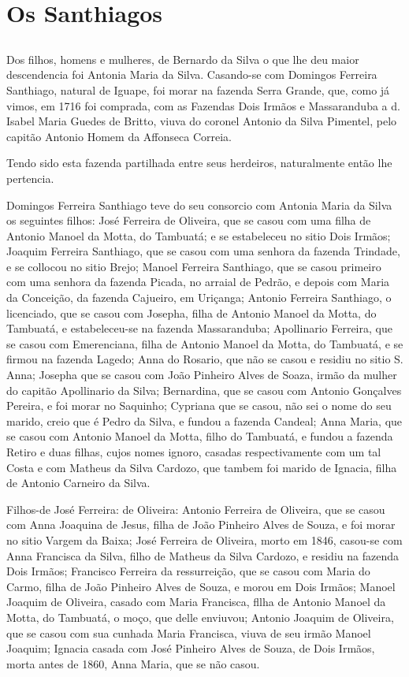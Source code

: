 \chapter{Os Santhiagos}
\section*{}
Dos filhos, homens e mulheres, de Bernardo da Silva o que lhe deu maior descendencia foi Antonia Maria da Silva. Casando-se com
Domingos Ferreira Santhiago, natural de Iguape, foi morar na fazenda Serra Grande, que, como já vimos, em 1716 foi comprada, com as Fazendas Dois Irmãos e Massaranduba a d. Isabel Maria Guedes de Britto, viuva do coronel Antonio da Silva Pimentel, pelo capitão Antonio Homem da Affonseca Correia.

Tendo sido esta fazenda partilhada entre seus herdeiros, naturalmente então lhe pertencia.

Domingos Ferreira Santhiago teve do seu consorcio com Antonia Maria da Silva os seguintes filhos: José Ferreira de Oliveira, que se casou com uma filha de Antonio Manoel da Motta, do Tambuatá; e se estabeleceu no sitio Dois Irmãos; Joaquim Ferreira Santhiago, que se casou com uma senhora da fazenda Trindade, e se collocou no sitio Brejo; Manoel Ferreira Santhiago, que se casou primeiro com uma senhora da fazenda Picada, no arraial de Pedrão, e depois com Maria da Conceição, da fazenda Cajueiro, em Uriçanga; Antonio Ferreira Santhiago, o licenciado, que se casou com Josepha, filha de Antonio Manoel da Motta, do Tambuatá, e estabeleceu-se na fazenda Massaranduba; Apollinario Ferreira, que se casou com Emerenciana, filha de Antonio Manoel da Motta, do Tambuatá, e se firmou na fazenda Lagedo; Anna do Rosario, que não se casou e residiu no sitio S. Anna; Josepha que se casou com João Pinheiro Alves de Soaza, irmão da mulher do capitão Apollinario da Silva; Bernardina, que se casou com Antonio Gonçalves Pereira, e foi morar no Saquinho; Cypriana que se casou, não sei o nome do seu marido, creio que é Pedro da Silva, e fundou a fazenda Candeal; Anna Maria, que se casou com Antonio Manoel da Motta, filho do Tambuatá, e fundou a fazenda Retiro e duas filhas, cujos nomes ignoro, casadas respectivamente com um tal Costa e com Matheus da Silva Cardozo, que tambem foi marido de Ignacia, filha de Antonio Carneiro da Silva.


Filhos-de José Ferreira: de Oliveira: Antonio Ferreira de Oliveira, que se casou com Anna Joaquina de Jesus, filha de João Pinheiro Alves de Souza, e foi morar no sitio Vargem da Baixa; José Ferreira de Oliveira, morto em 1846, casou-se com Anna Francisca da Silva, filho de Matheus da Silva Cardozo, e residiu na fazenda Dois Irmãos; Francisco Ferreira da ressurreição, que se casou com Maria do Carmo, filha de João Pinheiro Alves de Souza, e morou em Dois Irmãos; Manoel Joaquim de Oliveira, casado com Maria Francisca, fllha de Antonio Manoel da Motta, do Tambuatá, o moço, que delle enviuvou; Antonio Joaquim de Oliveira, que se casou com sua cunhada Maria Francisca, viuva de seu irmão Manoel Joaquim; Ignacia casada com José Pinheiro Alves de Souza, de Dois Irmãos, morta antes de 1860, Anna Maria, que se não casou. 

